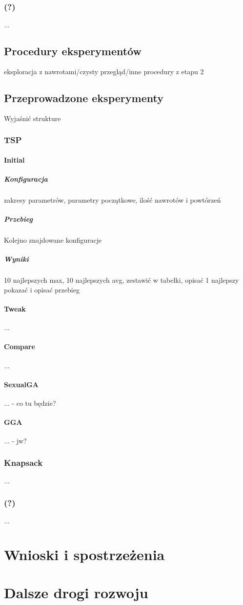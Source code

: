 \documentclass[twoside]{iisthesis}
\begin{document}
\subsection{(?)}
...
\section{Procedury eksperymentów}
eksploracja z nawrotami/czysty przegląd/inne procedury z etapu 2
\section{Przeprowadzone eksperymenty}
Wyjaśnić strukture
\subsection{TSP}
\subsubsection{Initial}
\paragraph{Konfiguracja}
zakresy parametrów, parametry początkowe, ilość nawrotów i powtórzeń
\paragraph{Przebieg}
Kolejno znajdowane konfiguracje
\paragraph{Wyniki}
10 najlepszych max, 10 najlepszych avg, zestawić w tabelki, opisać
1 najlepszy pokazać i opisać przebieg
\subsubsection{Tweak}
...
\subsubsection{Compare}
...
\subsubsection{SexualGA}
... - co tu będzie?
\subsubsection{GGA}
... - jw?
\subsection{Knapsack}
...
\subsection{(?)}
...

\chapter{Wnioski i spostrzeżenia}
\chapter{Dalsze drogi rozwoju}



\pagestyle{plain}

\listoffigures
\listoftables
{}



\end{document}
